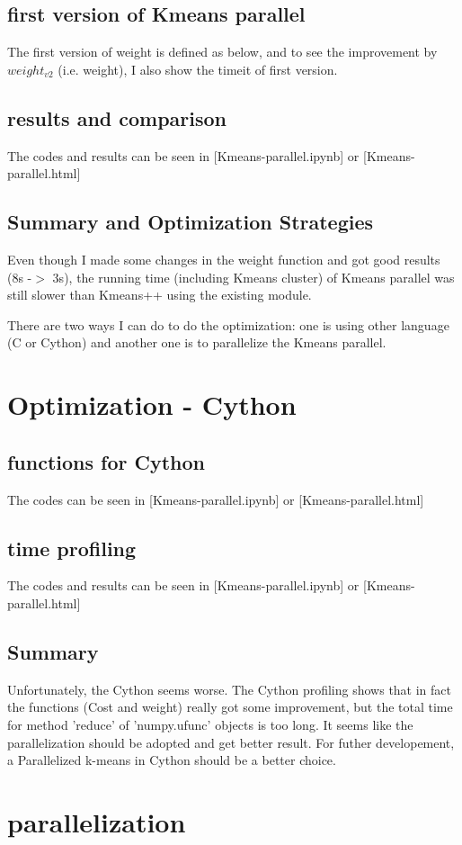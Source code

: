 \documentclass{article}
\begin{document}
\subsection{first version of Kmeans parallel}
The first version of weight is defined as below, and to see the improvement by $weight_{v2}$ (i.e. weight), I also show the timeit of first version.
\subsection{results and comparison}
The codes and results can be seen in [Kmeans-parallel.ipynb] or [Kmeans-parallel.html]
\subsection{Summary and Optimization Strategies}
Even though I made some changes in the weight function and got good results (8s -$>$ 3s), the running time (including Kmeans cluster) of Kmeans parallel was still slower than Kmeans++ using the existing module.

\vspace{2 mm}
There are two ways I can do to do the optimization: one is using other language (C or Cython) and another one is to parallelize the Kmeans parallel.
\section{Optimization - Cython}
\subsection{functions for Cython}
The codes can be seen in [Kmeans-parallel.ipynb] or [Kmeans-parallel.html]
\subsection{time profiling}
The codes and results can be seen in [Kmeans-parallel.ipynb] or [Kmeans-parallel.html]
\subsection{Summary}
Unfortunately, the Cython seems worse. The Cython profiling shows that in fact the functions (Cost and weight) really got some improvement, but the total time for {method 'reduce' of 'numpy.ufunc' objects} is too long. It seems like the parallelization should be adopted and get better result. For futher developement, a Parallelized k-means in Cython should be a better choice.
\section{parallelization}
\end{document}

